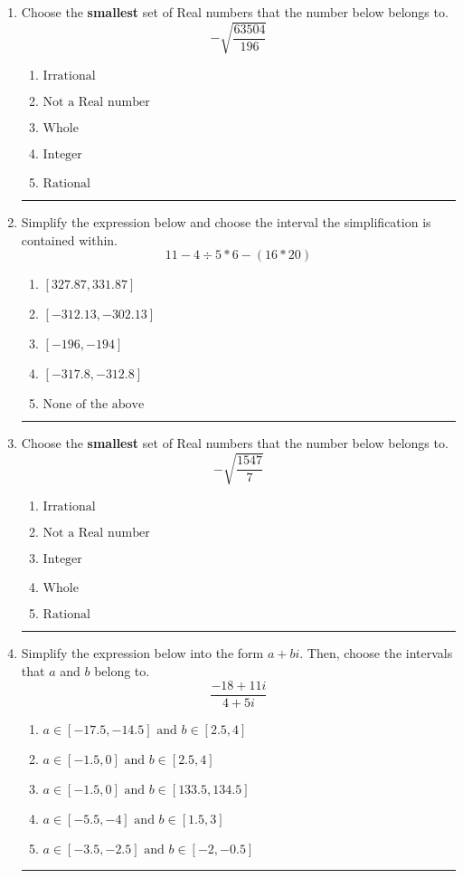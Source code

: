 \documentclass[14pt]{extbook}
\newcommand{\litem}[1]{\item#1\hspace*{-1cm}\rule{\textwidth}{0.4pt}}
\begin{document}
\begin{enumerate}
\litem{
Choose the \textbf{smallest} set of Real numbers that the number below belongs to.\[ -\sqrt{\frac{63504}{196}} \]\begin{enumerate}[label=\Alph*.]
\item \( \text{Irrational} \)
\item \( \text{Not a Real number} \)
\item \( \text{Whole} \)
\item \( \text{Integer} \)
\item \( \text{Rational} \)

\end{enumerate} }
\litem{
Simplify the expression below and choose the interval the simplification is contained within.\[ 11 - 4 \div 5 * 6 - (16 * 20) \]\begin{enumerate}[label=\Alph*.]
\item \( [327.87, 331.87] \)
\item \( [-312.13, -302.13] \)
\item \( [-196, -194] \)
\item \( [-317.8, -312.8] \)
\item \( \text{None of the above} \)

\end{enumerate} }
\litem{
Choose the \textbf{smallest} set of Real numbers that the number below belongs to.\[ -\sqrt{\frac{1547}{7}} \]\begin{enumerate}[label=\Alph*.]
\item \( \text{Irrational} \)
\item \( \text{Not a Real number} \)
\item \( \text{Integer} \)
\item \( \text{Whole} \)
\item \( \text{Rational} \)

\end{enumerate} }
\litem{
Simplify the expression below into the form $a+bi$. Then, choose the intervals that $a$ and $b$ belong to.\[ \frac{-18 + 11 i}{4 + 5 i} \]\begin{enumerate}[label=\Alph*.]
\item \( a \in [-17.5, -14.5] \text{ and } b \in [2.5, 4] \)
\item \( a \in [-1.5, 0] \text{ and } b \in [2.5, 4] \)
\item \( a \in [-1.5, 0] \text{ and } b \in [133.5, 134.5] \)
\item \( a \in [-5.5, -4] \text{ and } b \in [1.5, 3] \)
\item \( a \in [-3.5, -2.5] \text{ and } b \in [-2, -0.5] \)


\end{enumerate}}
\end{enumerate}
\end{document}
